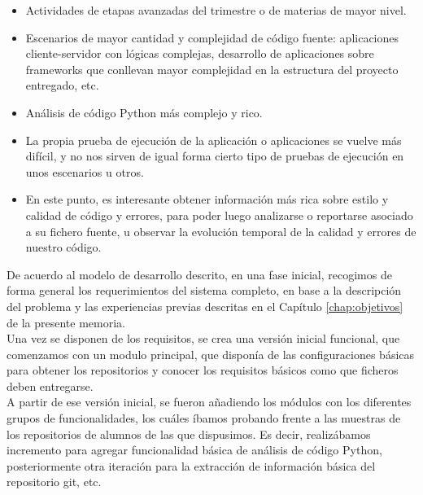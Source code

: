\begin{itemize}
\item Actividades de etapas avanzadas del trimestre o de materias de mayor nivel.\\

\item Escenarios de mayor cantidad y complejidad de código fuente: aplicaciones cliente-servidor con lógicas complejas, desarrollo de aplicaciones sobre frameworks que conllevan mayor complejidad en la estructura del proyecto entregado, etc.\\

\item Análisis de código Python más complejo y rico.\\

\item La propia prueba de ejecución de la aplicación o aplicaciones se vuelve más difícil, y no nos sirven de igual forma cierto tipo de pruebas de ejecución en unos escenarios u otros.\\

\item En este punto, es interesante obtener información más rica sobre estilo y calidad de código y errores, para poder luego analizarse o reportarse asociado a su fichero fuente, u observar la evolución temporal de la calidad y errores de nuestro código.
\end{itemize}


De acuerdo al modelo de desarrollo descrito, en una fase inicial, recogimos de forma general los requerimientos del sistema completo, en base a la descripción del problema y las experiencias previas descritas en el Capítulo \ref{chap:objetivos} de la presente memoria.\\


Una vez se disponen de los requisitos, se crea una versión inicial funcional, que comenzamos con un modulo principal, que disponía de las configuraciones básicas para obtener los repositorios y conocer los requisitos básicos como que ficheros deben entregarse.\\


A partir de ese versión inicial, se fueron añadiendo los módulos con los diferentes grupos de funcionalidades, los cuáles íbamos probando frente a las muestras de los repositorios de alumnos de las que dispusimos. Es decir, realizábamos incremento para agregar funcionalidad básica de análisis de código Python, posteriormente otra iteración para la extracción de información básica del repositorio git, etc.\\


